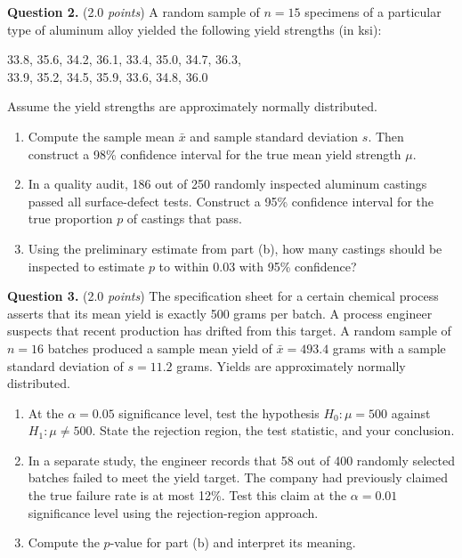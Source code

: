\documentclass[12pt]{article}
\begin{document}
\textbf{Question 2.} (2.0 \emph{points})
A random sample of $n = 15$ specimens of a particular type of aluminum
alloy yielded the following yield strengths (in ksi):
\begin{center}
33.8, 35.6, 34.2, 36.1, 33.4, 35.0, 34.7, 36.3,\\
33.9, 35.2, 34.5, 35.9, 33.6, 34.8, 36.0
\end{center}
Assume the yield strengths are approximately normally distributed.
\begin{enumerate}[label=(\alph*),leftmargin=*]
  \item Compute the sample mean $\bar{x}$ and sample standard
        deviation $s$. Then construct a 98\% confidence interval for
        the true mean yield strength $\mu$.
  \item In a quality audit, 186 out of 250 randomly inspected
        aluminum castings passed all surface-defect tests. Construct
        a 95\% confidence interval for the true proportion $p$ of
        castings that pass.
  \item Using the preliminary estimate from part (b), how many
        castings should be inspected to estimate $p$ to within
        0.03 with 95\% confidence?
\end{enumerate}

\textbf{Question 3.} (2.0 \emph{points})
The specification sheet for a certain chemical process asserts that
its mean yield is exactly 500 grams per batch. A process engineer
suspects that recent production has drifted from this target. A random
sample of $n = 16$ batches produced a sample mean yield of
$\bar{x} = 493.4$ grams with a sample standard deviation of
$s = 11.2$ grams. Yields are approximately normally distributed.
\begin{enumerate}[label=(\alph*),leftmargin=*]
  \item At the $\alpha = 0.05$ significance level, test the hypothesis
        $H_0: \mu = 500$ against $H_1: \mu \neq 500$. State the
        rejection region, the test statistic, and your conclusion.
  \item In a separate study, the engineer records that 58 out of 400
        randomly selected batches failed to meet the yield target.
        The company had previously claimed the true failure rate is
        at most 12\%. Test this claim at the $\alpha = 0.01$
        significance level using the rejection-region approach.
  \item Compute the $p$-value for part (b) and interpret its meaning.
\end{enumerate}
\end{document}
